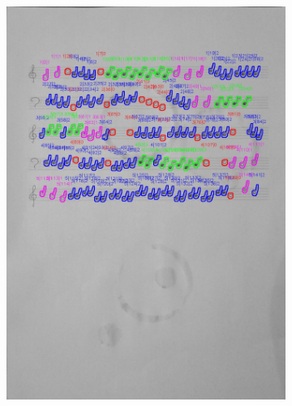 \documentclass[11pt]{article}
\begin{document}
\begin{figure}[H]
\begin{subfigure}{.45\textwidth}
        \includegraphics[width=\linewidth]{16_cnts.jpg}
        \label{fig:sub2}
    \end{subfigure}
    \label{fig:test}
\end{figure}
\end{document}
